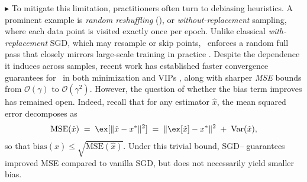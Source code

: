 $\blacktriangleright$ To mitigate this limitation, practitioners often turn to debiasing heuristics.  A prominent example is \emph{random reshuffling} (\RRresh), or \emph{without-replacement} sampling, where each data point is visited exactly once per epoch. Unlike classical \emph{with-replacement} SGD, which may resample or skip points, \RRresh\ enforces a random full pass that closely mirrors large-scale training in practice \citep{bottou2018optimization}. Despite the dependence it induces across samples, recent work has established faster convergence guarantees for \RRresh\ in both minimization \citep{ahn2020sgd,gurbuzbalaban2021random,cai2023empirical} and VIPs \citep{mishchenko2020revisiting,emmanouilidis2024stochastic}, along with sharper \emph{MSE} bounds from $\mathcal{O}(\gamma)$ to $\mathcal{O}(\gamma^2)$.
However, the question of whether the bias term improves has remained open.
Indeed, recall that for any estimator $\hat x$, the mean squared error decomposes as
\[
\mathrm{MSE}(\hat x) \;=\; \ex[\|\hat x - x^*\|^2] \;=\; \|\ex[\hat x]-x^*\|^2 \;+\; \mathrm{Var}(\hat x),
\]
so that $\mathrm{bias}(\hat x) \le \sqrt{\mathrm{MSE}(\hat x)}$. Under this trivial bound, \textsc{SGD–\RRresh} guarantees improved MSE compared to vanilla SGD, but does not necessarily yield smaller bias.



